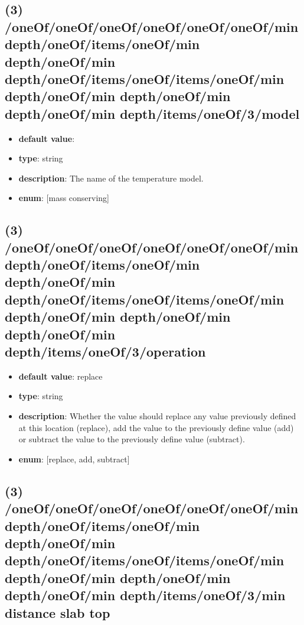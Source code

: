 \subsection{(3) /oneOf/oneOf/oneOf/oneOf/oneOf/oneOf/min depth/oneOf/items/oneOf/min depth/oneOf/min depth/oneOf/items/oneOf/items/oneOf/min depth/oneOf/min depth/oneOf/min depth/oneOf/min depth/items/oneOf/3/model}
\begin{itemize}[leftmargin=3em]\item {\bf default value}: 
\item {\bf type}: string
\item {\bf description}: The name of the temperature model.
\item {\bf enum}: [mass conserving]\end{itemize}\subsection{(3) /oneOf/oneOf/oneOf/oneOf/oneOf/oneOf/min depth/oneOf/items/oneOf/min depth/oneOf/min depth/oneOf/items/oneOf/items/oneOf/min depth/oneOf/min depth/oneOf/min depth/oneOf/min depth/items/oneOf/3/operation}
\begin{itemize}[leftmargin=3em]\item {\bf default value}: replace
\item {\bf type}: string
\item {\bf description}: Whether the value should replace any value previously defined at this location (replace), add the value to the previously define value (add) or subtract the value to the previously define value (subtract).
\item {\bf enum}: [replace, add, subtract]\end{itemize}\subsection{(3) /oneOf/oneOf/oneOf/oneOf/oneOf/oneOf/min depth/oneOf/items/oneOf/min depth/oneOf/min depth/oneOf/items/oneOf/items/oneOf/min depth/oneOf/min depth/oneOf/min depth/oneOf/min depth/items/oneOf/3/min distance slab top}
